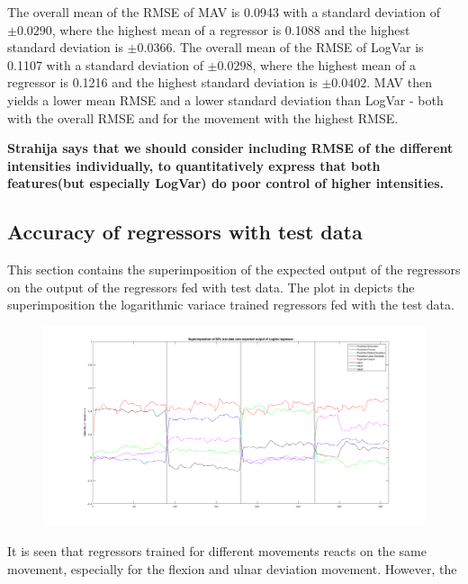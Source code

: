 The overall mean of the RMSE of MAV is 0.0943 with a standard deviation of $\pm 0.0290$, where the highest mean of a regressor is 0.1088 and the highest standard deviation is $\pm 0.0366$. The overall mean of the RMSE of LogVar is 0.1107 with a standard deviation of $\pm 0.0298$, where the highest mean of a regressor is 0.1216 and the highest standard deviation is $\pm 0.0402$. MAV then yields a lower mean RMSE and a lower standard deviation than LogVar - both with the overall RMSE and for the movement with the highest RMSE.


\textbf{Strahija says that we should consider including RMSE of the different intensities individually, to quantitatively express that both features(but especially LogVar) do poor control of higher intensities.}
\subsection{Accuracy of regressors with test data}
This section contains the superimposition of the expected output of the regressors on the output of the regressors fed with test data. The plot in  depicts the superimposition the logarithmic variace trained regressors fed with the test data.

\begin{figure}[H]
	\includegraphics[width=1\textwidth]{figures/results/SuperPoisonLogVarNewData}  %
	\caption{}
	\label{fig:SuperPoisonLogVarNewData}  %
\end{figure}

It is seen that regressors trained for different movements reacts on the same movement, especially for the flexion and ulnar deviation movement. However, the 

